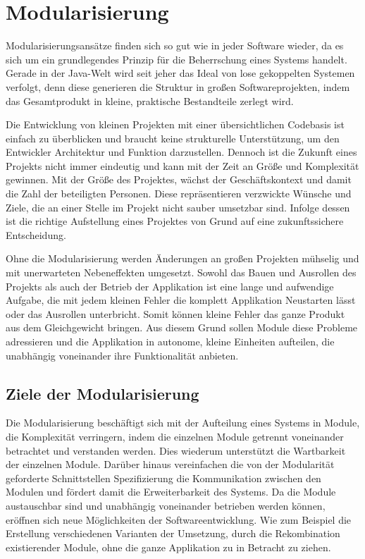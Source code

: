\chapter{Modularisierung} \label{cha:modularisierung}

  Modularisierungsansätze finden sich so gut wie in jeder Software wieder, da es sich um ein grundlegendes Prinzip für die Beherrschung eines Systems handelt. Gerade in der Java-Welt wird seit jeher das Ideal von lose gekoppelten Systemen verfolgt, denn diese generieren die Struktur in großen Softwareprojekten, indem das Gesamtprodukt in kleine, praktische Bestandteile zerlegt wird. \bigbreak
  
  Die Entwicklung von kleinen Projekten mit einer übersichtlichen Codebasis ist einfach zu überblicken und braucht keine strukturelle Unterstützung, um den Entwickler Architektur und Funktion darzustellen. Dennoch ist die Zukunft eines Projekts nicht immer eindeutig und kann mit der Zeit an Größe und Komplexität gewinnen. Mit der Größe des Projektes, wächst der Geschäftskontext und damit die Zahl der beteiligten Personen. Diese repräsentieren verzwickte Wünsche und Ziele, die an einer Stelle im Projekt nicht sauber umsetzbar sind. Infolge dessen ist die richtige Aufstellung eines Projektes von Grund auf eine zukunftssichere Entscheidung.\bigbreak 

  Ohne die Modularisierung werden Änderungen an großen Projekten mühselig und mit unerwarteten Nebeneffekten umgesetzt. Sowohl das Bauen und Ausrollen des Projekts als auch der Betrieb der Applikation ist eine lange und aufwendige Aufgabe, die mit jedem kleinen Fehler die komplett Applikation Neustarten lässt oder das Ausrollen unterbricht. Somit können kleine Fehler das ganze Produkt aus dem Gleichgewicht bringen. Aus diesem Grund sollen Module diese Probleme adressieren und die Applikation in autonome, kleine Einheiten aufteilen, die unabhängig voneinander ihre Funktionalität anbieten.

  \section{Ziele der Modularisierung} \label{sec:ZdM}
    Die Modularisierung beschäftigt sich mit der Aufteilung eines Systems in Module, die Komplexität verringern, indem die einzelnen Module getrennt voneinander betrachtet und verstanden werden. Dies wiederum unterstützt die Wartbarkeit der einzelnen Module. Darüber hinaus vereinfachen die von der Modularität geforderte Schnittstellen Spezifizierung die Kommunikation zwischen den Modulen und fördert damit die Erweiterbarkeit des Systems. Da die Module austauschbar sind und unabhängig voneinander betrieben werden können, eröffnen sich neue Möglichkeiten der Softwareentwicklung. Wie zum Beispiel die Erstellung verschiedenen Varianten der Umsetzung, durch die Rekombination existierender Module, ohne die ganze Applikation zu in Betracht zu ziehen.\cite{javaMod9,java9modRevealed,explorJava9}\bigbreak

